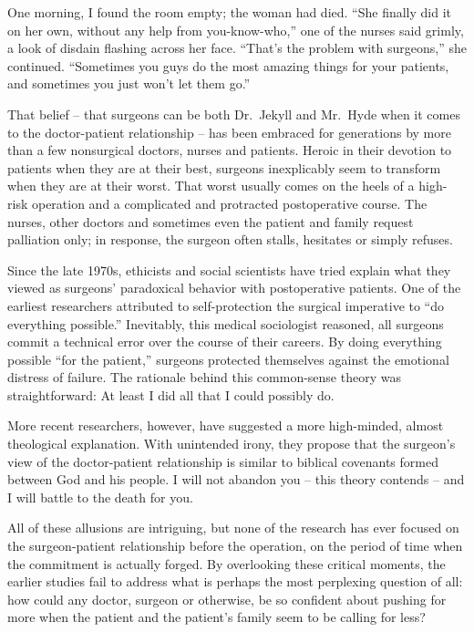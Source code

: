 ﻿\documentclass[12pt]{article}
\begin{document}
One morning, I found the room empty; the woman had died. ``She finally did it on her own, without
any help from you-know-who,'' one of the nurses said grimly, a look of disdain flashing across her
face. ``That's the problem with surgeons,'' she continued. ``Sometimes you guys do the most amazing
things for your patients, and sometimes you just won't let them go.''

That belief -- that surgeons can be both Dr.~Jekyll and Mr.~Hyde when it comes to the doctor-patient
relationship -- has been embraced for generations by more than a few nonsurgical doctors, nurses and
patients. Heroic in their devotion to patients when they are at their best, surgeons inexplicably
seem to transform when they are at their worst. That worst usually comes on the heels of a high-risk
operation and a complicated and protracted postoperative course. The nurses, other doctors and
sometimes even the patient and family request palliation only; in response, the surgeon often
stalls, hesitates or simply refuses.

Since the late 1970s, ethicists and social scientists have tried explain what they viewed as
surgeons' paradoxical behavior with postoperative patients. One of the earliest researchers
attributed to self-protection the surgical imperative to ``do everything possible.'' Inevitably,
this medical sociologist reasoned, all surgeons commit a technical error over the course of their
careers. By doing everything possible ``for the patient,'' surgeons protected themselves against the
emotional distress of failure. The rationale behind this common-sense theory was straightforward: At
least I did all that I could possibly do.

More recent researchers, however, have suggested a more high-minded, almost theological explanation.
With unintended irony, they propose that the surgeon's view of the doctor-patient relationship is
similar to biblical covenants formed between God and his people. I will not abandon you -- this
theory contends -- and I will battle to the death for you.

All of these allusions are intriguing, but none of the research has ever focused on the
surgeon-patient relationship before the operation, on the period of time when the commitment is
actually forged. By overlooking these critical moments, the earlier studies fail to address what is
perhaps the most perplexing question of all: how could any doctor, surgeon or otherwise, be so
confident about pushing for more when the patient and the patient's family seem to be calling for
less?
\end{document}
